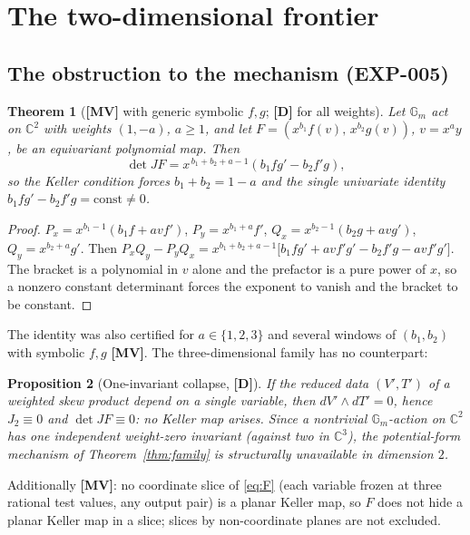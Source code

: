 \documentclass[11pt]{article}
\newtheorem{theorem}{Theorem}[section]
\newtheorem{proposition}[theorem]{Proposition}
\theoremstyle{definition}
\theoremstyle{remark}
\newcommand{\C}{\mathbb{C}}
\newcommand{\Gm}{\mathbb{G}_m}
\newcommand{\detJ}{\det JF}
\newcommand{\MV}{\textbf{[MV]}}
\newcommand{\DD}{\textbf{[D]}}
\begin{document}
\section{The two-dimensional frontier}\label{sec:planar}

\subsection{The obstruction to the mechanism (EXP-005)}\label{sec:obstruction}

\begin{theorem}[{\MV} with generic symbolic $f, g$; {\DD} for all weights]\label{thm:2d}
Let $\Gm$ act on $\C^2$ with weights $(1, -a)$, $a \ge 1$, and let $F = (x^{b_1} f(v),\,
x^{b_2} g(v))$, $v = x^a y$, be an equivariant polynomial map. Then
\begin{equation}\label{eq:det2d}
\detJ = x^{\,b_1 + b_2 + a - 1}\left(b_1 f g' - b_2 f' g\right),
\end{equation}
so the Keller condition forces $b_1 + b_2 = 1 - a$ and the single univariate identity
$b_1 f g' - b_2 f' g = \mathrm{const} \ne 0$.
\end{theorem}
\begin{proof}
$P_x = x^{b_1-1}(b_1 f + a v f')$, $P_y = x^{b_1+a}f'$, $Q_x = x^{b_2-1}(b_2 g + a v g')$, $Q_y = x^{b_2+a}g'$. Then $P_xQ_y - P_yQ_x = x^{b_1+b_2+a-1}\bigl[b_1fg' + a v f'g' - b_2f'g - a v f'g'\bigr]$. The bracket is a polynomial in $v$ alone and the prefactor is a pure power of $x$, so a nonzero constant determinant forces the exponent to vanish and the bracket to be constant.
\end{proof}

The identity was also certified for $a \in \{1,2,3\}$ and several windows of $(b_1,b_2)$ with symbolic $f, g$ \MV. The three-dimensional family has no counterpart:

\begin{proposition}[One-invariant collapse, {\DD}]\label{prop:collapse}
If the reduced data $(V', T')$ of a weighted skew product depend on a single variable, then
$dV' \wedge dT' = 0$, hence $J_2 \equiv 0$ and $\detJ \equiv 0$: no Keller map arises. Since a
nontrivial $\Gm$-action on $\C^2$ has one independent weight-zero invariant (against two in
$\C^3$), the potential-form mechanism of Theorem~\ref{thm:family} is structurally unavailable in
dimension $2$.
\end{proposition}

Additionally \MV: no coordinate slice of \eqref{eq:F} (each variable frozen at three rational test values, any output pair) is a planar Keller map, so $F$ does not hide a planar Keller map in a slice; slices by non-coordinate planes are not excluded.
\end{document}
